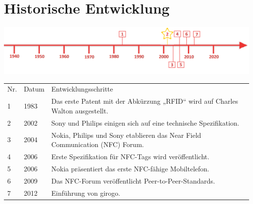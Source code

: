 \section*{Historische Entwicklung}
\includegraphics[width=\textwidth]{Kapitel/NFC/Grafiken/Zeitstrahl2}
\par
\noindent
{}
\begin{tabular}{p{0.5 cm}p{1.5 cm}p{15.55 cm}}
	Nr. & Datum & Entwicklungsschritte~\cite{nfc.1}\\
	1 & 1983 & Das erste Patent mit der Abkürzung „RFID“ wird auf Charles Walton ausgestellt.\\
	2 & 2002 & Sony und Philips einigen sich auf eine technische Spezifikation.\\
	3 & 2004 & Nokia, Philips und Sony etablieren das Near Field Communication (NFC) Forum.\\
	4 & 2006 & Erste Spezifikation für NFC-Tags wird veröffentlicht.\\
	5 & 2006 & Nokia präsentiert das erste NFC-fähige Mobiltelefon.\\
	6 & 2009 & Das NFC-Forum veröffentlicht Peer-to-Peer-Standards.\\
	7 & 2012 & Einführung von girogo.\\
\end{tabular}
\par
